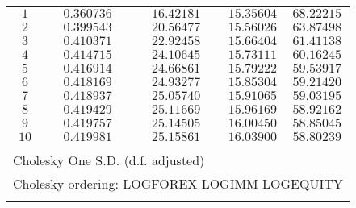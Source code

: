 \begin{tabular}{lrrrr}
\multicolumn{1}{c}{$1$}&\multicolumn{1}{c}{$0.360736$}&\multicolumn{1}{c}{$16.42181$}&\multicolumn{1}{c}{$15.35604$}&\multicolumn{1}{c}{$68.22215$}\\
\multicolumn{1}{c}{$2$}&\multicolumn{1}{c}{$0.399543$}&\multicolumn{1}{c}{$20.56477$}&\multicolumn{1}{c}{$15.56026$}&\multicolumn{1}{c}{$63.87498$}\\
\multicolumn{1}{c}{$3$}&\multicolumn{1}{c}{$0.410371$}&\multicolumn{1}{c}{$22.92458$}&\multicolumn{1}{c}{$15.66404$}&\multicolumn{1}{c}{$61.41138$}\\
\multicolumn{1}{c}{$4$}&\multicolumn{1}{c}{$0.414715$}&\multicolumn{1}{c}{$24.10645$}&\multicolumn{1}{c}{$15.73111$}&\multicolumn{1}{c}{$60.16245$}\\
\multicolumn{1}{c}{$5$}&\multicolumn{1}{c}{$0.416914$}&\multicolumn{1}{c}{$24.66861$}&\multicolumn{1}{c}{$15.79222$}&\multicolumn{1}{c}{$59.53917$}\\
\multicolumn{1}{c}{$6$}&\multicolumn{1}{c}{$0.418169$}&\multicolumn{1}{c}{$24.93277$}&\multicolumn{1}{c}{$15.85304$}&\multicolumn{1}{c}{$59.21420$}\\
\multicolumn{1}{c}{$7$}&\multicolumn{1}{c}{$0.418937$}&\multicolumn{1}{c}{$25.05740$}&\multicolumn{1}{c}{$15.91065$}&\multicolumn{1}{c}{$59.03195$}\\
\multicolumn{1}{c}{$8$}&\multicolumn{1}{c}{$0.419429$}&\multicolumn{1}{c}{$25.11669$}&\multicolumn{1}{c}{$15.96169$}&\multicolumn{1}{c}{$58.92162$}\\
\multicolumn{1}{c}{$9$}&\multicolumn{1}{c}{$0.419757$}&\multicolumn{1}{c}{$25.14505$}&\multicolumn{1}{c}{$16.00450$}&\multicolumn{1}{c}{$58.85045$}\\
\multicolumn{1}{c}{$10$}&\multicolumn{1}{c}{$0.419981$}&\multicolumn{1}{c}{$25.15861$}&\multicolumn{1}{c}{$16.03900$}&\multicolumn{1}{c}{$58.80239$}\\
[4.5pt] \hline \\ [-4.5pt]
\multicolumn{3}{l}{Cholesky One S.D. (d.f. adjusted)}&\multicolumn{1}{c}{}&\multicolumn{1}{c}{}\\
\multicolumn{5}{l}{Cholesky ordering:  LOGFOREX LOGIMM LOGEQUITY}\\
[4.5pt] \hline \\ [-4.5pt]
\end{tabular}